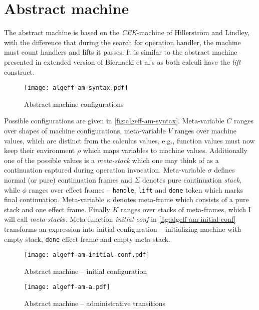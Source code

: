 \documentclass[inz, english, shortabstract]{iithesis}
\begin{document}
\section{Abstract machine}
The abstract machine is based on the \emph{CEK}-machine of Hillerström and Lindley\cite{Hillerstrom2016}, with the difference that during the search for operation handler, the machine must count handlers and lifts it passes.
It is similar to the abstract machine presented in extended version of Biernacki et al's \cite{Biernacki2017} as both calculi have the \emph{lift} construct.

\begin{figure}
  \centering
  \texttt{[image: algeff-am-syntax.pdf]}
  \caption{Abstract machine configurations}
  \label{fig:algeff-am-syntax}
\end{figure}

Possible configurations are given in \autoref{fig:algeff-am-syntax}.
Meta-variable $ C $ ranges over shapes of machine configurations, meta-variable $ V $ ranges over machine values, which are distinct from the calculus values, e.g., function values must now keep their environment $ \rho $ which maps variables to machine values.
Additionally one of the possible values is a \emph{meta-stack} which one may think of as a continuation captured during operation invocation.
Meta-variable $ \sigma $ defines normal (or pure) continuation frames and $ \Sigma $ denotes pure continuation \emph{stack}, while $ \phi $ ranges over effect frames -- \texttt{handle}, \texttt{lift} and \texttt{done} token which marks final continuation.
Meta-variable $ \kappa $ denotes meta-frame which consists of a pure stack and one effect frame.
Finally $ K $ ranges over stacks of meta-frames, which I will call \emph{meta-stack}s.
Meta-function \textit{initial-conf} in \autoref{fig:algeff-am-initial-conf} transforms an expression into initial configuration -- initializing machine with empty stack, \texttt{done} effect frame and empty meta-stack.

\begin{figure}
  \centering
  \texttt{[image: algeff-am-initial-conf.pdf]}
  \caption{Abstract machine -- initial configuration}
  \label{fig:algeff-am-initial-conf}
\end{figure}

\begin{figure}[h]
  \centering
  \texttt{[image: algeff-am-a.pdf]} 
  \caption{Abstract machine -- administrative transitions}
  \label{fig:algeff-am-a}
\end{figure}
\end{document}

